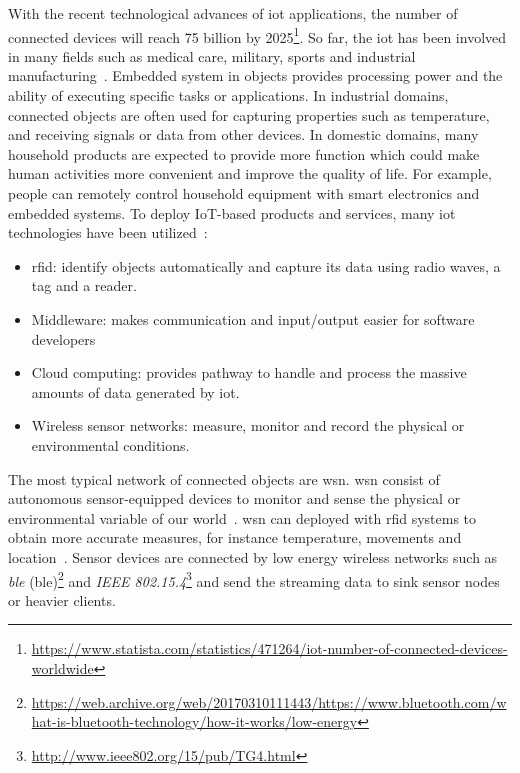 With the recent technological advances of \acrfull{iot} applications, the number
of connected devices will reach 75 billion by 2025\footnote{\url{https://www.statista.com/statistics/471264/iot-number-of-connected-devices-worldwide}}.
So far, the \acrshort{iot} has been involved in many fields such as medical
care, military, sports and industrial
manufacturing~\cite{boudargham2017exhaustive, lai2013survey, da2014internet}.
Embedded system in objects provides processing power and the ability of
executing specific tasks or applications. In industrial domains, connected
objects are often used for capturing properties such as temperature, and
receiving signals or data from other devices. In domestic domains, many
household products are expected to provide more function which could make human
activities more convenient and improve the quality of life. For example, people
can remotely control household equipment with smart electronics and embedded
systems. To deploy IoT-based products and services, many \acrshort{iot}
technologies have been utilized~\cite{lee2015internet}:
\begin{itemize}
    \item \acrfull{rfid}: identify objects automatically
    and capture its data using radio waves, a tag and a reader.
    \item Middleware: makes communication and input/output easier for software
    developers
    \item Cloud computing: provides pathway to handle and process the massive
    amounts of data generated by \acrshort{iot}.
    \item Wireless sensor networks: measure, monitor and record the physical
    or environmental conditions.
\end{itemize}

The most typical network of connected objects are \acrfull{wsn}. \acrshort{wsn}
consist of autonomous sensor-equipped devices to monitor and sense the physical
or environmental variable of our world~\cite{lee2015internet, li2016temporal}.
\acrshort{wsn} can deployed with \acrshort{rfid} systems to obtain more accurate
measures, for instance temperature, movements and
location~\cite{lee2015internet, atzori2010b}. Sensor devices are connected by
low energy wireless networks such as \emph{\acrlong{ble}}
(\acrshort{ble})\footnote{\url{https://web.archive.org/web/20170310111443/https://www.bluetooth.com/what-is-bluetooth-technology/how-it-works/low-energy}}
and \emph{IEEE 802.15.4}\footnote{\url{http://www.ieee802.org/15/pub/TG4.html}}
and send the streaming data to sink sensor nodes or heavier clients.


